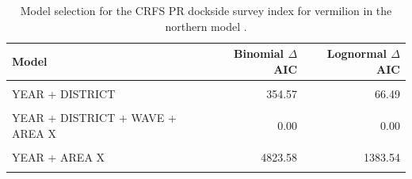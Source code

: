 \documentclass[11pt,
  english,
  a4paper,
]{article}
\begin{document}
\begin{table}

\caption{\label{tab:tab-model-select-crfspr}Model selection for the CRFS PR dockside survey index for vermilion in the northern model .}
\centering
\begin{tabular}[t]{lrr}
\toprule
Model & Binomial $\Delta$AIC & Lognormal $\Delta$AIC\\
\midrule
\cellcolor{gray!6}{1} & \cellcolor{gray!6}{5449.55} & \cellcolor{gray!6}{1685.78}\\
YEAR + DISTRICT & 354.57 & 66.49\\
\cellcolor{gray!6}{YEAR + DISTRICT + WAVE} & \cellcolor{gray!6}{327.23} & \cellcolor{gray!6}{24.39}\\
YEAR + DISTRICT + WAVE + AREA X & 0.00 & 0.00\\
\cellcolor{gray!6}{YEAR + WAVE + AREA X} & \cellcolor{gray!6}{4546.50} & \cellcolor{gray!6}{1301.84}\\
\addlinespace
YEAR + AREA X & 4823.58 & 1383.54\\
\cellcolor{gray!6}{YEAR + DISTRICT + AREA X} & \cellcolor{gray!6}{26.81} & \cellcolor{gray!6}{40.90}\\
\bottomrule
\end{tabular}
\end{table}

\FloatBarrier
\end{document}
